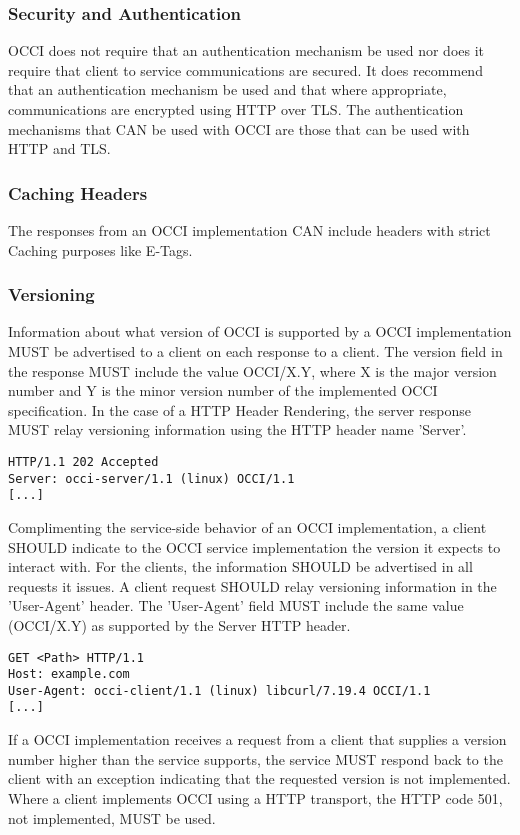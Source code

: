 \documentclass[10pt,a4paper]{article}
\begin{document}
\subsubsection{Security and Authentication}
OCCI does not require that an authentication mechanism be used nor
does it require that client to service communications are secured. It
does recommend that an authentication mechanism be used and that where
appropriate, communications are encrypted using HTTP over TLS. The
authentication mechanisms that CAN be used with OCCI are those that
can be used with HTTP and TLS.

\subsubsection{Caching Headers}
The responses from an OCCI implementation CAN include headers with
strict Caching purposes like E-Tags.

\subsubsection{Versioning}
Information about what version of OCCI is supported by a OCCI
implementation MUST be advertised to a client on each response to a
client. The version field in the response MUST include the value
OCCI/X.Y, where X is the major version number and Y is the minor
version number of the implemented OCCI specification. In the case of a
HTTP Header Rendering, the server response MUST relay versioning
information using the HTTP header name 'Server'.

\begin{verbatim}
HTTP/1.1 202 Accepted
Server: occi-server/1.1 (linux) OCCI/1.1
[...]
\end{verbatim}

Complimenting the service-side behavior of an OCCI implementation, a
client SHOULD indicate to the OCCI service implementation the version
it expects to interact with. For the clients, the information SHOULD
be advertised in all requests it issues. A client request SHOULD
relay versioning information in the 'User-Agent' header. The
'User-Agent' field MUST include the same value (OCCI/X.Y) as supported
by the Server HTTP header.

\begin{verbatim}
GET <Path> HTTP/1.1
Host: example.com
User-Agent: occi-client/1.1 (linux) libcurl/7.19.4 OCCI/1.1
[...]
\end{verbatim}

If a OCCI implementation receives a request from a client that
supplies a version number higher than the service supports, the
service MUST respond back to the client with an exception indicating
that the requested version is not implemented. Where a client
implements OCCI using a HTTP transport, the HTTP code 501, not
implemented, MUST be used.
\end{document}

